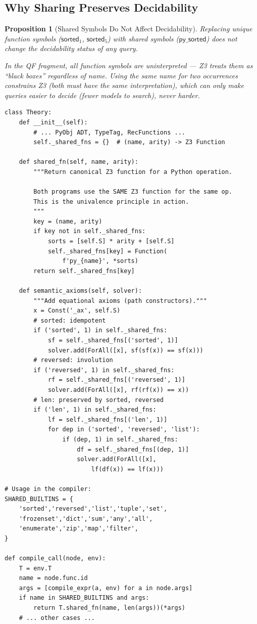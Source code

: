 \documentclass[11pt,a4paper]{report}
\theoremstyle{definition}
\theoremstyle{plain}
\newtheorem{proposition}[definition]{Proposition}
\begin{document}
\subsection{Why Sharing Preserves Decidability}

\begin{proposition}[Shared Symbols Do Not Affect Decidability]
Replacing unique function symbols ($\mathsf{sorted}_1$,
$\mathsf{sorted}_5$) with shared symbols ($\mathsf{py\_sorted}$)
does not change the decidability status of any query.

In the QF fragment, all function symbols are uninterpreted --- Z3
treats them as ``black boxes'' regardless of name.  Using the same
name for two occurrences \emph{constrains} Z3 (both must have the
same interpretation), which can only make queries \emph{easier} to
decide (fewer models to search), never harder.
\end{proposition}

\begin{lstlisting}[caption={Shared function registry: complete implementation}]
class Theory:
    def __init__(self):
        # ... PyObj ADT, TypeTag, RecFunctions ...
        self._shared_fns = {}  # (name, arity) -> Z3 Function

    def shared_fn(self, name, arity):
        """Return canonical Z3 function for a Python operation.

        Both programs use the SAME Z3 function for the same op.
        This is the univalence principle in action.
        """
        key = (name, arity)
        if key not in self._shared_fns:
            sorts = [self.S] * arity + [self.S]
            self._shared_fns[key] = Function(
                f'py_{name}', *sorts)
        return self._shared_fns[key]

    def semantic_axioms(self, solver):
        """Add equational axioms (path constructors)."""
        x = Const('_ax', self.S)
        # sorted: idempotent
        if ('sorted', 1) in self._shared_fns:
            sf = self._shared_fns[('sorted', 1)]
            solver.add(ForAll([x], sf(sf(x)) == sf(x)))
        # reversed: involution
        if ('reversed', 1) in self._shared_fns:
            rf = self._shared_fns[('reversed', 1)]
            solver.add(ForAll([x], rf(rf(x)) == x))
        # len: preserved by sorted, reversed
        if ('len', 1) in self._shared_fns:
            lf = self._shared_fns[('len', 1)]
            for dep in ('sorted', 'reversed', 'list'):
                if (dep, 1) in self._shared_fns:
                    df = self._shared_fns[(dep, 1)]
                    solver.add(ForAll([x],
                        lf(df(x)) == lf(x)))

# Usage in the compiler:
SHARED_BUILTINS = {
    'sorted','reversed','list','tuple','set',
    'frozenset','dict','sum','any','all',
    'enumerate','zip','map','filter',
}

def compile_call(node, env):
    T = env.T
    name = node.func.id
    args = [compile_expr(a, env) for a in node.args]
    if name in SHARED_BUILTINS and args:
        return T.shared_fn(name, len(args))(*args)
    # ... other cases ...
\end{lstlisting}
\end{document}
